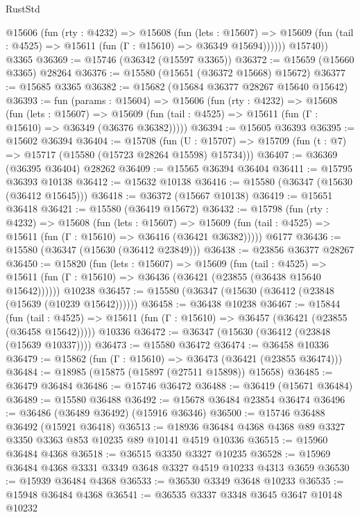 \begin{lexlean}{RustStd}
\begin{coremodule}
          @15606
            (fun (rty : @4232) =>
            @15608
              (fun (lets : @15607) =>
              @15609 (fun (tail : @4525) => @15611 (fun (Γ : @15610) => @36349 @15694))))))
        @15740))
    @3365
@36369 := @15746 (@36342 (@15597 @3365))
@36372 := @15659 (@15660 @3365) @28264
@36376 := @15580 (@15651 (@36372 @15668) @15672)
@36377 := @15685 @3365
@36382 := @15682 (@15684 @36377 @28267 @15640 @15642)
@36393 := fun (params : @15604) =>
  @15606
    (fun (rty : @4232) =>
    @15608
      (fun (lets : @15607) =>
      @15609 (fun (tail : @4525) => @15611 (fun (Γ : @15610) => @36349 (@36376 @36382)))))
@36394 := @15605 @36393
@36395 := @15602 @36394
@36404 := @15708
    (fun (U : @15707) => @15709 (fun (t : @7) => @15717 (@15580 (@15723 @28264 @15598) @15734)))
@36407 := @36369 (@36395 @36404) @28262
@36409 := @15565 @36394 @36404
@36411 := @15795 @36393 @10138
@36412 := @15632 @10138
@36416 := @15580 (@36347 (@15630 (@36412 @15645)))
@36418 := @36372 (@15667 @10138)
@36419 := @15651 @36418
@36421 := @15580 (@36419 @15672)
@36432 := @15798
    (fun (rty : @4232) =>
    @15608
      (fun (lets : @15607) =>
      @15609 (fun (tail : @4525) => @15611 (fun (Γ : @15610) => @36416 (@36421 @36382)))))
    @6177
@36436 := @15580 (@36347 (@15630 (@36412 @23849)))
@36438 := @23856 @36377 @28267
@36450 := @15820
    (fun (lets : @15607) =>
    @15609
      (fun (tail : @4525) =>
      @15611 (fun (Γ : @15610) => @36436 (@36421 (@23855 (@36438 @15640 @15642))))))
    @10238
@36457 := @15580 (@36347 (@15630 (@36412 (@23848 (@15639 (@10239 @15642))))))
@36458 := @36438 @10238
@36467 := @15844
    (fun (tail : @4525) => @15611 (fun (Γ : @15610) => @36457 (@36421 (@23855 (@36458 @15642)))))
    @10336
@36472 := @36347 (@15630 (@36412 (@23848 (@15639 @10337))))
@36473 := @15580 @36472
@36474 := @36458 @10336
@36479 := @15862 (fun (Γ : @15610) => @36473 (@36421 (@23855 @36474)))
@36484 := @18985 (@15875 (@15897 (@27511 @15898)) @15658)
@36485 := @36479 @36484
@36486 := @15746 @36472
@36488 := @36419 (@15671 @36484)
@36489 := @15580 @36488
@36492 := @15678 @36484 @23854 @36474
@36496 := @36486 (@36489 @36492) (@15916 @36346)
@36500 := @15746 @36488 @36492 (@15921 @36418)
@36513 := @18936 @36484 @4368 @4368 @89 @3327 @3350 @3363 @853 @10235 @89 @10141 @4519 @10336
@36515 := @15960 @36484 @4368
@36518 := @36515 @3350 @3327 @10235
@36528 := @15969 @36484 @4368 @3331 @3349 @3648 @3327 @4519 @10233 @4313 @3659
@36530 := @15939 @36484 @4368
@36533 := @36530 @3349 @3648 @10233
@36535 := @15948 @36484 @4368
@36541 := @36535 @3337 @3348 @3645 @3647 @10148 @10232

\end{coremodule}
\end{lexlean}
